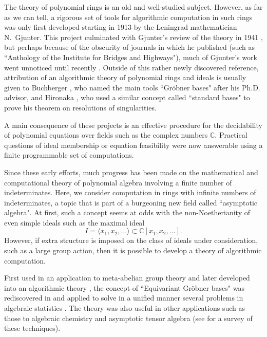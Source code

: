
The theory of polynomial rings is an old and well-studied subject.  However, as far as we can tell, a rigorous set of tools for algorithmic computation in such rings was only first developed starting in 1913 \cite{gjunter1913} by the Leningrad mathematician N.~Gjunter.  This project culminated with Gjunter's review of the theory in 1941 \cite{gunther1941modules}, but perhaps because of the obscurity of journals in which he published (such as ``Anthology of the Institute for Bridges and Highways"), much of Gjunter's work went unnoticed until recently \cite{renschuch2003contributions}.  Outside of this rather newly discovered reference, attribution of an algorithmic theory of polynomial rings and ideals is usually given to Buchberger \cite{buchberger1965algorithmus}, who named the main tools ``Gr\"obner bases" after his Ph.D. advisor, and Hironaka \cite{hironaka1964resolution}, who used a similar concept called ``standard bases" to prove his theorem on resolutions of singularities.  

A main consequence of these projects is an effective procedure for the decidability of polynomial equations over fields such as the complex numbers $\mathbb{C}$.  Practical questions of ideal membership or equation feasibility were now answerable using a finite programmable set of computations.  

Since these early efforts, much progress has been made on the mathematical and computational theory of polynomial algebra involving a finite number of indeterminates.  Here, we consider computation in rings with infinite numbers of indeterminates, a topic that is part of a burgeoning new field called ``asymptotic algebra".  At first, such a concept seems at odds with the non-Noetherianity of even simple ideals such as the maximal ideal \[I = \langle x_1, x_2, \ldots  \rangle \subset \mathbb C[x_1, x_2,\ldots].\]
However, if extra structure is imposed on the class of ideals under consideration, such as a large group action, then it is possible to develop a theory of algorithmic computation.  

First used in an application to meta-abelian group theory \cite{cohen1967laws} and later developed into an algorithmic theory \cite{Emmott, Cohen87}, the concept of ``Equivariant Gr\"obner bases" was rediscovered in \cite{aschenbrenner2007finite} and applied to solve in a unified manner several problems in algebraic statistics \cite{hillar2012finite}.  The theory was also useful in other applications such as those to algebraic chemistry \cite{Draisma08b} and asymptotic tensor algebra \cite{draisma2014bounded} (see \cite{draisma2014noetherianity} for a survey of these techniques).

